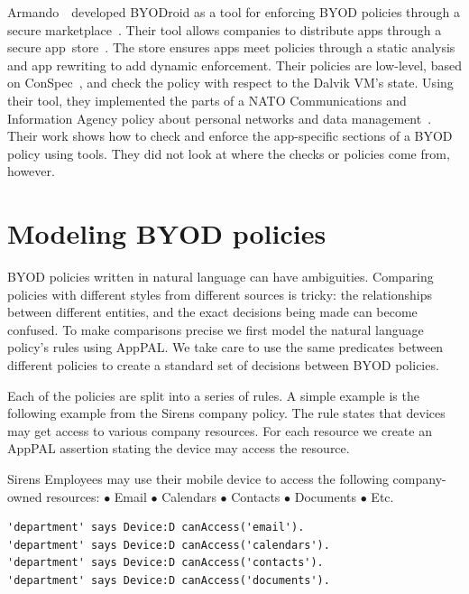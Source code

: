 \documentclass[thesis.tex]{subfiles}
\begin{document}
Armando~\etal~developed BYODroid as a tool for enforcing BYOD policies through a
secure marketplace~\cite{armando_bring_2013}. Their tool allows companies to
distribute apps through a secure app~store~\cite{armando_enabling_2014}. The
store ensures apps meet policies through a static analysis and
app rewriting to add dynamic enforcement. Their policies are low-level, based on
ConSpec~\cite{aktug_conspec_2008}, and check the policy with respect to the Dalvik VM's state.
Using their tool, they implemented the parts of a NATO Communications and
Information Agency policy about personal networks and data
management~\cite{armando_developing_2016}. Their work shows how to check and enforce the app-specific
sections of a BYOD policy using tools. They did not
look at where the checks or policies come from, however.


\section{Modeling BYOD policies}

BYOD policies written in natural language can have ambiguities. Comparing
policies with different styles from different sources is tricky: the
relationships between different entities, and the exact decisions being made can
become confused. To make comparisons precise we first model the natural language
policy's rules using AppPAL. We take care to use the same predicates between
different policies to create a standard set of decisions between \ac{BYOD}
policies.

Each of the policies are split into a series of rules. A simple example is the
following example from the Sirens company policy. The rule states that devices
may get access to various company resources. For each resource we create an
AppPAL assertion stating the device may access the resource.

\begin{policyrule}{Sirens}
  Employees may use their mobile device to access the following company-owned resources:
  \newline $\bullet$ Email $\bullet$ Calendars $\bullet$ Contacts $\bullet$ Documents $\bullet$ Etc.
  \normalfont
  \begin{lstlisting}
'department' says Device:D canAccess('email').
'department' says Device:D canAccess('calendars').
'department' says Device:D canAccess('contacts').
'department' says Device:D canAccess('documents').
  \end{lstlisting}
\end{policyrule}
\end{document}
